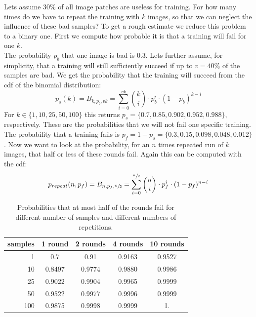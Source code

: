 Lets assume 30\% of all image patches are useless for training. For how many times do we have to repeat the training with $k$ images, so that we can neglect the influence of these bad samples? To get a rough estimate we reduce this problem to a binary one. First we compute how probable it is that a training will fail for one $k$.\\
The probability $p_b$ that one image is bad is $0.3$. Lets further assume, for simplicity, that a training will still sufficiently succeed if up to $v = 40\%$ of the samples are bad. We get the probability that the training will succeed from the \gls{cdf} of the binomial distribution:
\begin{equation}
    p_s(k) = B_{k,p_b, v k} = \sum_{i=0}^{v k} \binom{k}{i}\cdot p_b^i \cdot (1 - p_b)^{k - i}
\end{equation}
For $k\in\{1, 10, 25, 50, 100\}$ this returns $p_s = \{\num{0.7},\num{0.85},\num{0.902},\num{0.952},\num{0.988}\}$, respectively. These are the probabilities that we will not fail one specific training. The probability that a training fails is $p_f = 1 - p_s = \{\num{0.3},\num{0.15},\num{0.098},\num{0.048},\num{0.012}\}$. Now we want to look at the probability, for an $n$ times repeated run of $k$ images, that half or less of these rounds fail. Again this can be computed with the \gls{cdf}:
\begin{equation}
    p_{repeat}(n,p_f) = B_{n,p_f, \sfrac{n}{2}} = \sum_{i=0}^{\sfrac{n}{2}} \binom{n}{i}\cdot p_f^i \cdot (1 - p_f)^{n - i}
\end{equation}

\begin{table}
	\begin{center}
            \begin{tabular}{r|*{4}{c}}
                samples & 1 round & 2 rounds & 4 rounds & 10 rounds \\ \hline \rule{0pt}{3ex}
                1   & 0.7    &  0.91   &  0.9163 &  0.9527 \\
                10  & 0.8497 &  0.9774 &  0.9880 &  0.9986 \\
                25  & 0.9022 &  0.9904 &  0.9965 &  0.9999  \\
                50  & 0.9522 &  0.9977 &  0.9996 &  0.9999 \\
                100 & 0.9875 &  0.9998 &  0.9999 &  1.
            \end{tabular}
	\end{center}
    \caption{Probabilities that at most half of the rounds fail for different number of samples and different numbers of repetitions.}
    \label{tab:repeated_test_probs}
\end{table}

